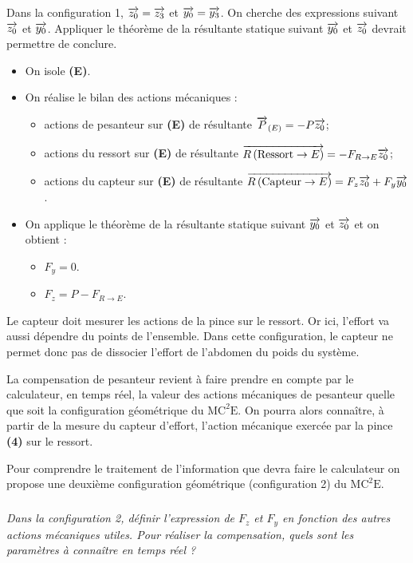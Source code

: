 \documentclass[10pt,fleqn]{article} %
\begin{document}
\begin{multicols}{2}
\begin{corrige}
\begin{methode}
Dans la configuration 1, $\overrightarrow{z_0}=\overrightarrow{z_3}$ et $\overrightarrow{y_0}=\overrightarrow{y_3}$. On cherche des expressions suivant $\overrightarrow{z_0}$ et $\overrightarrow{y_0}$. Appliquer le théorème de la résultante statique suivant $\overrightarrow{y_0}$ et $\overrightarrow{z_0}$ devrait permettre de conclure. 
\end{methode}
\begin{itemize}
\item On isole \textbf{(E)}.
\item On réalise le bilan des actions mécaniques : 
\begin{itemize}
\item actions de pesanteur sur \textbf{(E)} de résultante $\overrightarrow{P}_{(E)}=-P\overrightarrow{z_0}$;
\item actions du ressort sur \textbf{(E)} de résultante $\overrightarrow{R\left( {\text{Ressort}} \rightarrow {E}\right)}=-F_{R\to E} \overrightarrow{z_0}$;
\item actions du capteur sur \textbf{(E)} de résultante $\overrightarrow{R\left( {\text{Capteur}} \rightarrow {E}\right)}=F_z\overrightarrow{z_0}+F_y\overrightarrow{y_0}$.
\end{itemize}
\item On applique le théorème de la résultante statique suivant $\overrightarrow{y_0}$ et $\overrightarrow{z_0}$ et on obtient : 
\begin{itemize}
\item $F_y = 0$. 
\item $F_z = P- F_{R\to E}$. 
\end{itemize}
\end{itemize}
Le capteur doit mesurer les actions de la pince sur le ressort. Or ici, l'effort va aussi dépendre du points de l’ensemble. Dans cette configuration, le capteur ne permet donc pas de dissocier l'effort de l'abdomen du poids du système.
\end{corrige}
\else
\fi

\ifprof
\else
La compensation de pesanteur revient à faire prendre en compte par le calculateur, en temps réel, la valeur des actions mécaniques de pesanteur quelle que soit la configuration géométrique du $\text{MC}^2\text{E}$. On pourra alors connaître, à partir de la mesure du capteur d’effort, l’action mécanique exercée par la pince \textbf{(4)} sur le ressort.

Pour comprendre le traitement de l’information que devra faire le calculateur on propose une deuxième configuration géométrique (configuration 2) du $\text{MC}^2\text{E}$.

\fi
\subparagraph{}
\textit{Dans la configuration 2, définir l’expression de $F_z$ et $F_y$ en fonction des autres actions mécaniques utiles. Pour réaliser la compensation, quels sont les paramètres à connaître en temps réel ?}
\ifprof
\begin{corrige} ~\\


\end{corrige}
\end{multicols}
\end{document}
